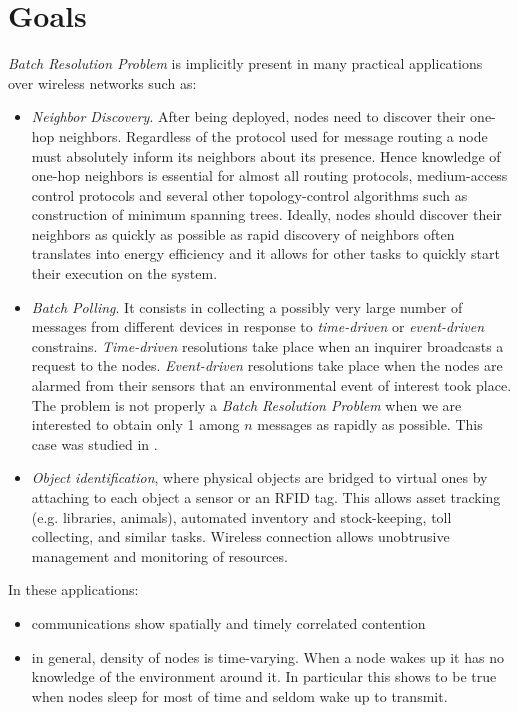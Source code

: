 \documentclass[11pt,a4paper,twoside,openright]{book}
\begin{document}
\section{Goals}
\emph{Batch Resolution Problem} is implicitly present in many practical applications over wireless networks such as:
\begin{itemize}
\item \emph{Neighbor Discovery}. After being deployed, nodes need to discover their one-hop neighbors. Regardless of the protocol used for message routing a node must absolutely inform its neighbors about its presence.
Hence knowledge of one-hop neighbors is essential for almost all routing protocols, medium-access control protocols and several other topology-control algorithms such as construction of minimum spanning trees.
Ideally, nodes should discover their neighbors as quickly as possible as rapid discovery of neighbors often translates into energy efficiency and it allows for other tasks to quickly start their execution on the system.
\item \emph{Batch Polling}. It consists in collecting a possibly very large number of messages from different devices in response to \emph{time-driven} or \emph{event-driven} constrains. \emph{Time-driven} resolutions take place when an inquirer broadcasts a request to the nodes. \emph{Event-driven} resolutions take place when the nodes are alarmed from their sensors that an environmental event of interest took place. The problem is not properly a \emph{Batch Resolution Problem} when we are interested to obtain only 1 among $n$ messages as rapidly as possible. This case was studied in \cite{sift}.
\item \emph{Object identification}, where physical objects are bridged to virtual ones by attaching to each object a sensor or an RFID tag. This allows asset tracking (e.g. libraries, animals), automated inventory and stock-keeping, toll collecting, and similar tasks. Wireless connection allows unobtrusive management and monitoring of resources.
\end{itemize}

In these applications:
\begin{itemize}
\item communications show spatially and timely correlated contention
\item in general, density of nodes is time-varying. When a node wakes up it has no knowledge of the environment around it. In particular this shows to be true when nodes sleep for most of time and seldom wake up to transmit.
\end{itemize}
 
\end{document}
